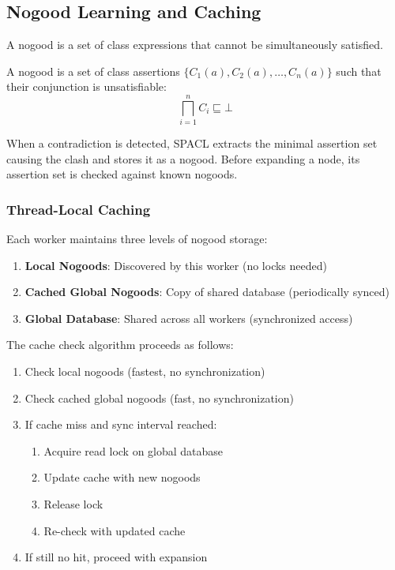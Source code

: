 \documentclass[preprint,12pt]{elsarticle}
\begin{document}
\subsection{Nogood Learning and Caching}
\label{sec:nogood}

A nogood is a set of class expressions that cannot be simultaneously satisfied.

\begin{definition}[Nogood]
\label{def:nogood}
A nogood is a set of class assertions $\{C_1(a), C_2(a), \ldots, C_n(a)\}$ such that their conjunction is unsatisfiable:
\begin{equation}
\bigsqcap_{i=1}^{n} C_i \sqsubseteq \bot
\end{equation}
\end{definition}

When a contradiction is detected, SPACL extracts the minimal assertion set causing the clash and stores it as a nogood. Before expanding a node, its assertion set is checked against known nogoods.

\subsubsection{Thread-Local Caching}
\label{sec:cache}

Each worker maintains three levels of nogood storage:

\begin{enumerate}
    \item \textbf{Local Nogoods}: Discovered by this worker (no locks needed)
    \item \textbf{Cached Global Nogoods}: Copy of shared database (periodically synced)
    \item \textbf{Global Database}: Shared across all workers (synchronized access)
\end{enumerate}

The cache check algorithm proceeds as follows:

\begin{enumerate}
    \item Check local nogoods (fastest, no synchronization)
    \item Check cached global nogoods (fast, no synchronization)
    \item If cache miss and sync interval reached:
    \begin{enumerate}
        \item Acquire read lock on global database
        \item Update cache with new nogoods
        \item Release lock
        \item Re-check with updated cache
    \end{enumerate}
    \item If still no hit, proceed with expansion
\end{enumerate}
\end{document}
